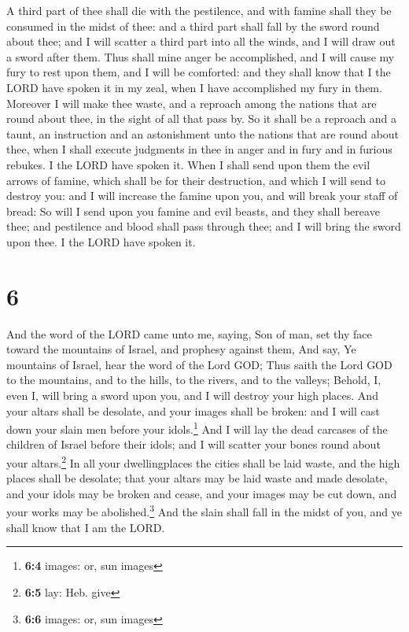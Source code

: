  A third part of thee shall die with the pestilence, and
with famine shall they be consumed in the midst of thee: and a third
part shall fall by the sword round about thee; and I will scatter a
third part into all the winds, and I will draw out a sword after them.
 Thus shall mine anger be accomplished, and I will cause
my fury to rest upon them, and I will be comforted: and they shall know
that I the LORD have spoken it in my zeal, when I have accomplished my
fury in them.  Moreover I will make thee waste, and a
reproach among the nations that are round about thee, in the sight of
all that pass by.  So it shall be a reproach and a taunt,
an instruction and an astonishment unto the nations that are round about
thee, when I shall execute judgments in thee in anger and in fury and in
furious rebukes. I the LORD have spoken it.  When I shall
send upon them the evil arrows of famine, which shall be for their
destruction, and which I will send to destroy you: and I will increase
the famine upon you, and will break your staff of bread: 
So will I send upon you famine and evil beasts, and they shall bereave
thee; and pestilence and blood shall pass through thee; and I will bring
the sword upon thee. I the LORD have spoken it.

\hypertarget{section-5}{%
\section{6}\label{section-5}}

 And the word of the LORD came unto me, saying,
 Son of man, set thy face toward the mountains of Israel,
and prophesy against them,  And say, Ye mountains of
Israel, hear the word of the Lord GOD; Thus saith the Lord GOD to the
mountains, and to the hills, to the rivers, and to the valleys; Behold,
I, even I, will bring a sword upon you, and I will destroy your high
places.  And your altars shall be desolate, and your
images shall be broken: and I will cast down your slain men before your
idols.\footnote{\textbf{6:4} images: or, sun images}  And
I will lay the dead carcases of the children of Israel before their
idols; and I will scatter your bones round about your altars.\footnote{\textbf{6:5}
  lay: Heb. give}  In all your dwellingplaces the cities
shall be laid waste, and the high places shall be desolate; that your
altars may be laid waste and made desolate, and your idols may be broken
and cease, and your images may be cut down, and your works may be
abolished.\footnote{\textbf{6:6} images: or, sun images} 
And the slain shall fall in the midst of you, and ye shall know that I
am the LORD.


